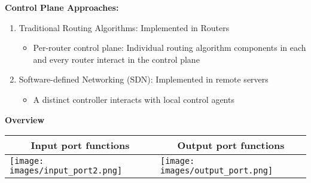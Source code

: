 \documentclass[a4paper]{article}
\begin{document}
\noindent\textbf{Control Plane Approaches:}
\begin{enumerate}
    \item Traditional Routing Algorithms: Implemented in Routers
    \begin{itemize}[label=$\circ$]
        \item Per-router control plane: Individual routing algorithm components in each and every router interact in the control plane
    \end{itemize}
    \item Software-defined Networking (SDN): Implemented in remote servers
    \begin{itemize}[label=$\circ$]
        \item A distinct controller interacts with local control agents
    \end{itemize}
\end{enumerate}

\noindent\textbf{Overview}
\begin{table}[H]
    \setcellgapes{5pt}
    \centering\makegapedcells
    \begin{tabular}{|l|l|}
    \hline
    \multicolumn{1}{|c|}{\textbf{Input port functions}} & \multicolumn{1}{c|}{\textbf{Output port functions}} \\ \hline
    \texttt{[image: images/input\_port2.png]} & \texttt{[image: images/output\_port.png]} \\ \hline
    \end{tabular}
\end{table}
\end{document}

